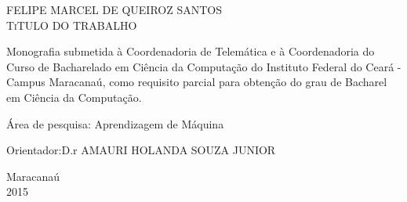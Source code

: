 \begin{titlepage}
\vfill
\begin{center}

    {\large FELIPE MARCEL DE QUEIROZ SANTOS\\}
    \vspace{2cm}
    {\Large \textsc{TiTULO DO TRABALHO}\\}
    \vspace{1cm}
    \hspace{.45\linewidth}
    \begin{minipage}{.50\linewidth}

            Monografia submetida à Coordenadoria de Telemática e à Coordenadoria do Curso de Bacharelado 
            em Ciência da Computação do Instituto Federal do Ceará - Campus Maracanaú, como requisito 
            parcial para obtenção do grau de Bacharel em Ciência da Computação.

            \vspace{0.5 cm}

            Área de pesquisa: Aprendizagem de Máquina

            \vspace{0.5 cm}

            Orientador:D.r AMAURI HOLANDA SOUZA JUNIOR
    
    \end{minipage}

    \vspace{2cm}
    \vfill
    {\large Maracanaú\\ 2015}
\end{center}

\end{titlepage}